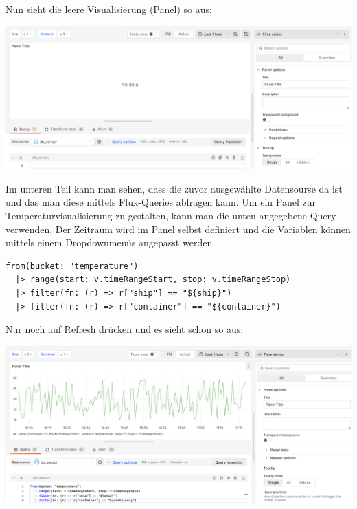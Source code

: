\documentclass[
    headings=optiontotocandhead,%
    twoside,
    numbers=noenddot,%
    12pt, %
    titlepage, %
    parskip=full, %
    listof=leveldown, 
    numbers=noenddot, %
    a4paper,DIV=14,
    BCOR=15mm,
]{scrbook}
\let\origfigure=\figure
\let\endorigfigure=\endfigure
\renewenvironment{figure}[1][]{%
   \origfigure[H]
}{%
   \endorigfigure
}
\begin{document}
Nun sieht die leere Visualisierung (Panel) so aus:

\begin{figure}
\centering
\includegraphics[width=1\textwidth,height=\textheight]{img/Schrempf/grafana-empty-panel.png}
\caption{Leeres Grafana Panel}
\end{figure}

Im unteren Teil kann man sehen, dass die zuvor ausgewählte Datensourse
da ist und das man diese mittels Flux-Queries abfragen kann. Um ein
Panel zur Temperaturvisualisierung zu gestalten, kann man die unten
angegebene Query verwenden. Der Zeitraum wird im Panel selbst definiert
und die Variablen können mittels einem Dropdownmenüs angepasst werden.

\begin{lstlisting}[caption={Flux-Query für Temperaturwerte in Grafana}]
from(bucket: "temperature")
  |> range(start: v.timeRangeStart, stop: v.timeRangeStop)
  |> filter(fn: (r) => r["ship"] == "${ship}")
  |> filter(fn: (r) => r["container"] == "${container}")
\end{lstlisting}

Nur noch auf Refresh drücken und es sieht schon so aus:

\begin{figure}
\centering
\includegraphics[width=1\textwidth,height=\textheight]{img/Schrempf/grafana-simple-panel.png}
\caption{Simples Grafana Panel}
\end{figure}
\end{document}
